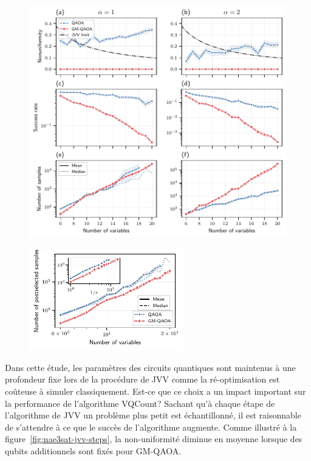 \begin{figure}[h!]
    \centering
    \includegraphics[width=1\textwidth]{figures/nae3sat-number-of-samples.pdf}
    \caption[Biais d'échantillonnage de \#NAE3SAT]{}
    \label{fig:nae3sat-number-of-samples}
\end{figure}

\begin{figure}[h!]
    \centering
    \includegraphics[width=0.6\textwidth]{figures/nae3sat-scaling.pdf}
    \caption[Comportement d'échelle du nombre d'échantillons post-sélectés pour \#NAE3SAT]{}
    \label{fig:nae3sat-scaling}
\end{figure}

Dans cette étude, les paramètres des circuits quantiques sont maintenus à une profondeur fixe lors de la procédure de JVV comme la ré-optimisation est coûteuse à simuler classiquement. Est-ce que ce choix a un impact important sur la performance de l'algorithme VQCount? Sachant qu'à chaque étape de l'algorithme de JVV un problème plus petit est échantillonné, il est raisonnable de s'attendre à ce que le succès de l'algorithme augmente. Comme illustré à la figure~\ref{fig:nae3sat-jvv-steps}, la non-uniformité diminue en moyenne lorsque des qubits additionnels sont fixés pour GM-QAOA. 

